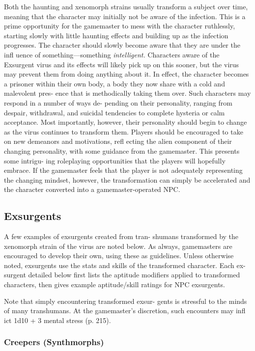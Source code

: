 Both the haunting and xenomorph strains usually 
transform a subject over time, meaning that the 
character may initially not be aware of the infection. 
This is a prime opportunity for the gamemaster to 
mess with the character ruthlessly, starting slowly 
with little haunting effects and building up as the 
infection progresses. The character should slowly 
become aware that they are under the infl uence of 
something—something \textit{intelligent.} Characters aware 
of the Exsurgent virus and its effects will likely pick 
up on this sooner, but the virus may prevent them 
from doing anything about it. In effect, the character 
becomes a prisoner within their own body, a body 
they now share with a cold and malevolent pres-
ence that is methodically taking them over. Such 
characters may respond in a number of ways de-
pending on their personality, ranging from despair, 
withdrawal, and suicidal tendencies to complete 
hysteria or calm acceptance. Most importantly, 
however, their personality should begin to change 
as the virus continues to transform them. Players 
should be encouraged to take on new demeanors 
and motivations, refl ecting the alien component 
of their changing personality, with some guidance 
from the gamemaster. This presents some intrigu-
ing roleplaying opportunities that the players will 
hopefully embrace. If the gamemaster feels that the 
player is not adequately representing the changing 
mindset, however, the transformation can simply 
be accelerated and the character converted into a 
gamemaster-operated NPC. 

\subsection{Exsurgents }

A few examples of exsurgents created from tran-
shumans transformed by the xenomorph strain of 
the virus are noted below. As always, gamemasters 
are encouraged to develop their own, using these as 
guidelines. Unless otherwise noted, exsurgents use the 
stats and skills of the transformed character. Each ex-
surgent detailed below first lists the aptitude modifiers 
applied to transformed characters, then gives example 
aptitude/skill ratings for NPC exsurgents.

Note that simply encountering transformed exsur-
gents is stressful to the minds of many transhumans. 
At the gamemaster's discretion, such encounters may 
infl ict 1d10 + 3 mental stress (p. 215).

\subsubsection{Creepers (Synthmorphs)}

